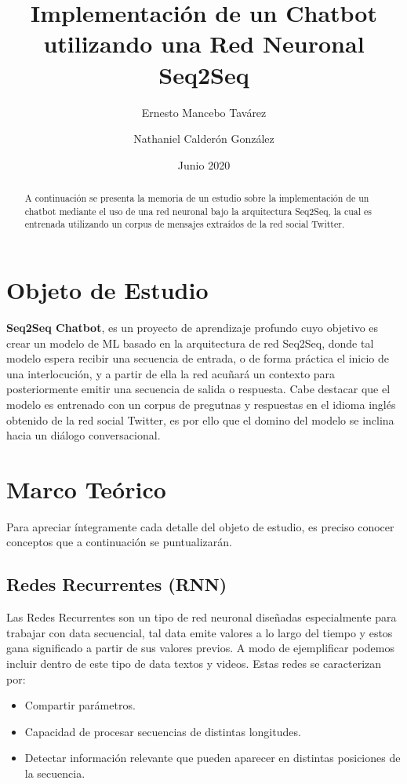 \documentclass[12pt, letterpaper]{article}
\title{Implementación de un Chatbot utilizando una Red Neuronal Seq2Seq}
\author{Ernesto Mancebo Tavárez \and Nathaniel Calderón González}
\affil{Procesamiento del Lenguaje Natural, MULCIA \\ Universidad de Sevilla, Sevilla, España}
\date{Junio 2020}
\begin{document}
    \begin{titlepage}
        \maketitle
        \begin{abstract}
            A continuación se presenta la memoria de un estudio sobre la implementación de un chatbot mediante el uso de una red neuronal bajo la arquitectura Seq2Seq, la cual es entrenada utilizando un corpus de mensajes extraídos de la red social Twitter.
        \end{abstract}
    \end{titlepage}

    \tableofcontents
    \pagebreak

    \section{Objeto de Estudio}
    \textbf{Seq2Seq Chatbot}, es un proyecto de aprendizaje profundo cuyo objetivo es crear un modelo de ML basado en la arquitectura de red Seq2Seq, donde tal modelo espera recibir una secuencia de entrada, o de forma práctica el inicio de una interlocución, y a partir de ella la red acuñará un contexto para posteriormente emitir una secuencia de salida o respuesta. Cabe destacar que el modelo es entrenado con un corpus de pregutnas y respuestas en el idioma inglés obtenido de la red social Twitter, es por ello que el domino del modelo se inclina hacia un diálogo conversacional.
    
    \section{Marco Teórico}
    Para apreciar íntegramente cada detalle del objeto de estudio, es preciso conocer conceptos que a continuación se puntualizarán.

    \subsection{Redes Recurrentes (RNN)}
        Las Redes Recurrentes son un tipo de red neuronal diseñadas especialmente para trabajar con data secuencial, tal data emite valores a lo largo del tiempo y estos gana significado a partir de sus valores previos. A modo de ejemplificar podemos incluir dentro de este tipo de data textos y videos. Estas redes se caracterizan por:
        
        \begin{itemize}
            \item Compartir parámetros.
            \item Capacidad de procesar secuencias de distintas longitudes.
            \item Detectar información relevante que pueden aparecer en distintas posiciones de la secuencia.
        \end{itemize}
    
\end{document}
